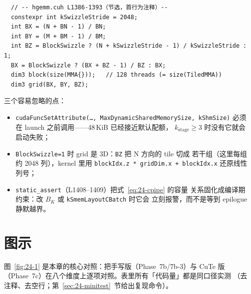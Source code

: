 \begin{lstlisting}
  // -- hgemm.cuh L1386-1393（节选，首行为注释）--
  constexpr int kSwizzleStride = 2048;
  int BX = (N + BN - 1) / BN;
  int BY = (M + BM - 1) / BM;
  int BZ = BlockSwizzle ? (N + kSwizzleStride - 1) / kSwizzleStride : 1;
  BX = BlockSwizzle ? (BX + BZ - 1) / BZ : BX;
  dim3 block(size(MMA{}));   // 128 threads (= size(TiledMMA))
  dim3 grid(BX, BY, BZ);
\end{lstlisting}



三个容易忽略的点：

\begin{itemize}
  \item \texttt{cuda\allowbreak{}Func\allowbreak{}Set\allowbreak{}Attribute\allowbreak{}(\dots,\allowbreak{} Max\allowbreak{}Dynamic\allowbreak{}Shared\allowbreak{}Memory\allowbreak{}Size,\allowbreak{} k\allowbreak{}Shm\allowbreak{}Size)}
        必须在 launch 之前调用——48\,KiB 已经接近默认配额，
        $k_{\mathrm{stage}}\geq3$ 时没有它就会启动失败；
  \item \texttt{Block\allowbreak{}Swizzle=\allowbreak{}1} 时 grid 是 3D：\texttt{BZ} 把 N 方向的 tile 切成
        若干组（这里每组约 2048 列），kernel 里用
        \texttt{blockIdx.z * gridDim.x + blockIdx.x} 还原线性列号；
  \item \texttt{static\_\allowbreak{}assert}（L1408--1409）把式~\eqref{eq:24-cpipe} 的容量
        关系固化成编译期约束：改 $B_K$ 或 \texttt{k\allowbreak{}Smem\allowbreak{}Layout\allowbreak{}CBatch} 时它会
        立刻报警，而不是等到 epilogue 静默越界。
\end{itemize}

\needspace{75mm}

\section{图示}

图~\ref{fig:24-1} 是本章的核心对照：把手写版（Phase~7b/7b-3）与 CuTe 版
（Phase~7c）在八个维度上逐项对照。表里所有「代码量」都是同口径实测
（去注释、去空行；第~\ref{sec:24-minitest}~节给出复现命令）。

